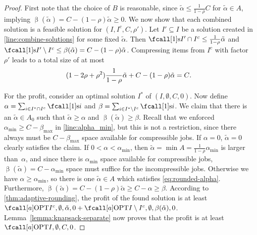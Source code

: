\begin{proof}
  First note that the choice of $B$ is reasonable,
  since $\tilde{\alpha} \leq \frac{1}{1-\rho}C$ for $\tilde{\alpha} \in A$,
  implying $\mathop{\beta}(\tilde{\alpha}) = C - (1 - \rho) \tilde{\alpha} \geq 0$.
  We now show that each combined solution is a feasible solution for $(I, I^c, C, \rho')$.
  Let $I' \subseteq I$ be a solution created in \cref{line:combine-solutions} for some fixed $\tilde{\alpha}$.
  Then $\s{I' \cap I^c} \leq \frac{1}{1-\rho} \tilde{\alpha}$
  and $\s{I' \setminus I^c} \leq \mathop{\beta}(\tilde{\alpha}) = C - (1 - \rho) \tilde{\alpha}$.
  Compressing items from $I^c$ with factor $\rho'$ leads to a total size of at most
  \begin{equation}
      (1-2\rho+\rho^2) \frac{1}{1-\rho} \tilde{\alpha} + C - (1-\rho) \tilde{\alpha}
      = C \text{.}
  \end{equation}
  
  For the profit,
  consider an optimal solution $I^*$ of $(I, \emptyset, C, 0)$.
  Now define $\alpha = \sum_{i \in I^* \cap I^c} \s{i}$
  and $\beta = \sum_{i \in I^* \setminus I^c} \s{i}$.
  We claim that there is an $\tilde{\alpha} \in A_0$ such that
  $\tilde{\alpha} \geq \alpha$ and $\mathop{\beta}(\tilde{\alpha}) \geq \beta$.
  Recall that we enforced $\alpha_{\min} \geq C - \beta_{\max}$ in \cref{line:alpha_min},
  but this is not a restriction,
  since there always must be $C - \beta_{\max}$ space available for compressible jobs.
  If $\alpha = 0$, $\tilde{\alpha} = 0$ clearly satisfies the claim.
  If $0 < \alpha < \alpha_{\min}$,
  then $\tilde{\alpha} = \min A = \frac{1}{1-\rho} \alpha_{\min}$ is larger than~$\alpha$,
  and since there is $\alpha_{\min}$ space available for compressible jobs,
  $\mathop{\beta}(\tilde{\alpha}) = C - \alpha_{\min}$ space must suffice for the incompressible jobs.
  Otherwise we have $\alpha \geq \alpha_{\min}$,
  so there is one $\tilde{\alpha} \in A$ which satisfies \cref{eq:rounded-alpha}.
  Furthermore, $\mathop{\beta}(\tilde{\alpha}) = C - (1-\rho) \tilde{\alpha} \geq C - \alpha \geq \beta$. 
  According to \cref{thm:adaptive-rounding},
  the profit of the found solution is at least
  $\KPCOPT{I^c, \emptyset, \tilde{\alpha}, 0} + \KPCOPT{I \setminus I^c, \emptyset, \mathop{\beta}(\tilde{\alpha}), 0}$.
  Lemma~\ref{lemma:knapsack-separate} now proves that the profit is at least $\KPCOPT{I, \emptyset, C, 0}$.
  

\end{proof}

